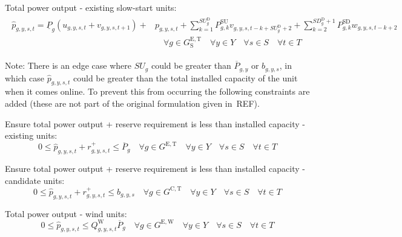 \documentclass{article}
\newcommand{\sGeneratorsExistingThermal}{G^{\mathrm{E,T}}}
\newcommand{\sGeneratorsExistingWind}{G^{\mathrm{E,W}}}
\newcommand{\sGeneratorsCandidateThermal}{G^{\mathrm{C,T}}}
\newcommand{\sYears}{Y}
\newcommand{\sScenarios}{S}
\newcommand{\sIntervals}{T}
\newcommand{\sGeneratorsExistingThermalSlowStart}{G^{\mathrm{E,T}}_\mathrm{S}}
\newcommand{\iGenerator}{g}
\newcommand{\iYear}{y}
\newcommand{\iScenario}{s}
\newcommand{\iInterval}{t}
\newcommand{\iIntervalAlias}{k}
\newcommand{\cPowerOutputMax}[1][\iGenerator,\iYear]{\overline{P}_{#1}}
\newcommand{\cPowerOutputMin}[1][\iGenerator]{\underline{P}_{#1}}
\newcommand{\cStartupDuration}[1][\iGenerator]{SU_{#1}^{\mathrm{D}}}
\newcommand{\cStartupTrajectory}[1][\iGenerator,\iIntervalAlias]{P^{\mathrm{SU}}_{#1}}
\newcommand{\cShutdownDuration}[1][\iGenerator]{SD_{#1}^{\mathrm{D}}}
\newcommand{\cShutdownTrajectory}[1][\iGenerator,\iIntervalAlias]{P^{\mathrm{SD}}_{#1}}
\newcommand{\cCapacityFactorWind}[1][\iGenerator,\iYear,\iScenario,\iInterval]{Q_{#1}^{\mathrm{W}}}
\newcommand{\cRampRateStartup}[1][\iGenerator]{SU_{#1}}
\newcommand{\vStartupIndicator}[1][\iGenerator,\iYear,\iScenario,\iInterval]{v_{#1}}
\newcommand{\vShutdownIndicator}[1][\iGenerator,\iYear,\iScenario,\iInterval]{w_{#1}}
\newcommand{\vReserveUp}[1][\iGenerator,\iYear,\iScenario,\iInterval]{r^{+}_{#1}}
\newcommand{\vOnIndicator}[1][\iGenerator,\iYear,\iScenario,\iInterval]{u_{#1}}
\newcommand{\vPower}[1][\iGenerator,\iYear,\iScenario,\iInterval]{p_{#1}}
\newcommand{\vPowerTotal}[1][\iGenerator,\iYear,\iScenario,\iInterval]{\hat{p}_{#1}}
\newcommand{\vInstalledCapacityTotalScenario}[1][\iGenerator,\iYear,\iScenario]{b_{#1}}
\begin{document}
Total power output - existing slow-start units:
\begin{align}
\begin{split}
\vPowerTotal =  \cPowerOutputMin \left(\vOnIndicator + \vStartupIndicator[\iGenerator,\iYear,\iScenario,\iInterval+1]\right) + & \vPower + \sum\limits_{\iIntervalAlias=1}^{\cStartupDuration} \cStartupTrajectory \vStartupIndicator[\iGenerator,\iYear,\iScenario,\iInterval-\iIntervalAlias+\cStartupDuration+2] + \sum\limits_{\iIntervalAlias=2}^{\cShutdownDuration + 1} \cShutdownTrajectory \vShutdownIndicator[\iGenerator,\iYear,\iScenario,\iInterval-\iIntervalAlias+2]\\
& \quad \forall \iGenerator \in \sGeneratorsExistingThermalSlowStart \quad \forall \iYear \in \sYears \quad \forall \iScenario \in \sScenarios \quad \forall \iInterval \in \sIntervals
\end{split}
\end{align}

Note: There is an edge case where $\cRampRateStartup$ could be greater than $\cPowerOutputMax$ or $\vInstalledCapacityTotalScenario$, in which case $\vPowerTotal$ could be greater than the total installed capacity of the unit when it comes online. To prevent this from occurring the following constraints are added (these are not part of the original formulation given in~REF).

Ensure total power output + reserve requirement is less than installed capacity - existing units:
\begin{equation}
	0 \leq \vPowerTotal + \vReserveUp \leq \cPowerOutputMax[\iGenerator] \quad \forall \iGenerator \in \sGeneratorsExistingThermal \quad \forall \iYear \in \sYears \quad \forall \iScenario \in \sScenarios \quad \forall \iInterval \in \sIntervals
\end{equation}

Ensure total power output + reserve requirement is less than installed capacity - candidate units:
\begin{equation}
	0 \leq \vPowerTotal + \vReserveUp \leq \vInstalledCapacityTotalScenario \quad \forall \iGenerator \in \sGeneratorsCandidateThermal \quad \forall \iYear \in \sYears \quad \forall \iScenario \in \sScenarios \quad \forall \iInterval \in \sIntervals
\end{equation}

Total power output - wind units:
\begin{equation}
0 \leq \vPowerTotal \leq \cCapacityFactorWind \cPowerOutputMax[\iGenerator] \quad \forall \iGenerator \in \sGeneratorsExistingWind \quad \forall \iYear \in \sYears \quad \forall \iScenario \in \sScenarios \quad \forall \iInterval \in \sIntervals 
\end{equation}
\end{document}
